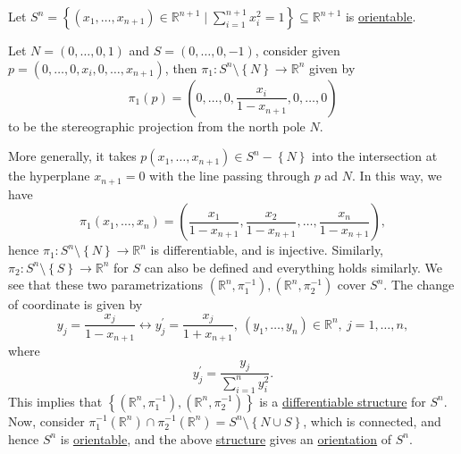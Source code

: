 \begin{eg}
	Let \(S^n = \left\{ (x_1, \ldots , x_{n+1})\in \mathbb{R} ^{n+1} \mid \sum_{i=1}^{n+1} x_i^2 = 1 \right\} \subseteq \mathbb{R} ^{n+1}\) is \hyperref[def:orientable]{orientable}.
\end{eg}
\begin{explanation}
	Let \(N=(0, \ldots , 0, 1)\) and \(S=(0, \ldots , 0, -1)\), consider given \(p=(0, \ldots , 0, x_i, 0, \ldots , x_{n+1} )\), then \(\pi _1\colon S^n \setminus \left\{ N \right\} \to \mathbb{R} ^n\) given by
	\[
		\pi _1(p) = \left( 0, \ldots , 0, \frac{x_i}{1-x_{n+1}}, 0, \ldots , 0 \right)
	\]
	to be the stereographic projection from the north pole \(N\).

	\begin{center}
	\end{center}

	More generally, it takes \(p(x_1, \ldots , x_{n+1})\in S^{n}-\left\{ N \right\}\) into the intersection at the hyperplane \(x_{n+1}= 0\) with the line passing through \(p\) ad \(N\). In this way, we have
	\[
		\pi _1(x_1, \ldots , x_n) = \left( \frac{x_1}{1-x_{n+1}}, \frac{x_2}{1-x_{n+1}}, \ldots , \frac{x_n}{1-x_{n+1}} \right),
	\]
	hence \(\pi _1\colon S^n \setminus \left\{ N \right\} \to  \mathbb{R} ^n\) is differentiable, and is injective. Similarly, \(\pi _2\colon S^n \setminus \left\{ S \right\} \to  \mathbb{R} ^n\) for \(S\) can also be defined and everything holds similarly. We see that these two parametrizations \((\mathbb{R} ^n, \pi _1 ^{-1} ), (\mathbb{R} ^n, \pi _2 ^{-1} )\) cover \(S^n\). The change of coordinate is given by
	\[
		y_j = \frac{x_j}{1 - x_{n+1}} \leftrightarrow y_j^\prime = \frac{x_j}{1 + x_{n+1}},\ (y_1, \ldots , y_n) \in \mathbb{R} ^n,\ j = 1, \ldots , n,
	\]
	where
	\[
		y_j ^\prime = \frac{y_j }{\sum_{i=1}^n y_i ^2 }.
	\]
	This implies that \(\left\{ (\mathbb{R} ^n, \pi _1 ^{-1} ), (\mathbb{R} ^n, \pi _2 ^{-1} ) \right\} \) is a \hyperref[def:smooth-structure]{differentiable structure} for \(S^n\). Now, consider \(\pi _1 ^{-1} (\mathbb{R} ^n) \cap \pi _2 ^{-1} (\mathbb{R} ^n) = S^n \setminus \left\{ N \cup S \right\} \), which is connected, and hence \(S^n\) is \hyperref[def:orientable]{orientable}, and the above \hyperref[def:smooth-structure]{structure} gives an \hyperref[def:orientation]{orientation} of \(S^n\).
\end{explanation}
